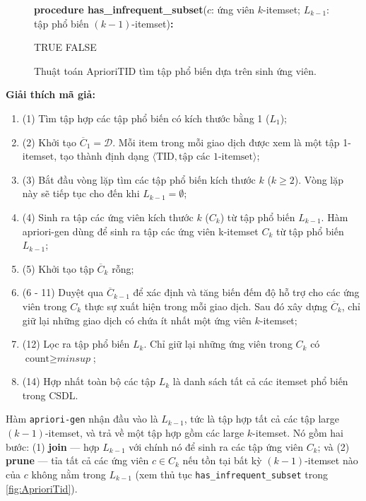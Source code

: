 \begin{figure}[!ht]
\begin{minipage}{\linewidth}
\vspace{0.6em}
\noindent\textbf{procedure has\_infrequent\_subset}($c$: ứng viên $k$-itemset; $L_{k-1}$: tập phổ biến $(k{-}1)$-itemset)\textbf{:}
\begin{algorithmic}[1]
        \State \Return TRUE
    \EndIf
\EndFor
\State \Return FALSE
\end{algorithmic}
\end{minipage}
\caption{Thuật toán AprioriTID tìm tập phổ biến dựa trên sinh ứng viên.}
\label{fig:AprioriTid}
\end{figure}

\textbf{Giải thích mã giả:}
\begin{enumerate}
    \item (1) Tìm tập hợp các tập phổ biến có kích thước bằng 1 ($L_1$);
    \item (2) Khởi tạo $\overline{C}_1 = \mathcal{D}$. Mỗi item trong mỗi giao dịch được xem là một tập 1-itemset, tạo thành định dạng $\langle \text{TID}, \text{tập các 1-itemset} \rangle$;
    \item (3) Bắt đầu vòng lặp tìm các tập phổ biến kích thước $k$ ($k\geq2$). Vòng lặp này sẽ tiếp tục cho đến khi $L_{k-1} = \emptyset$;
    \item (4) Sinh ra tập các ứng viên kích thước $k$ ($C_k$) từ tập phổ biến $L_{k-1}$. Hàm apriori-gen dùng để sinh ra tập các ứng viên k-itemset $C_k$ từ tập phổ biến $L_{k-1}$;
    \item (5) Khởi tạo tập $\overline{C}_k$ rỗng;
    \item (6 - 11) Duyệt qua $\overline{C}_{k-1}$ để xác định và tăng biến đếm độ hỗ trợ cho các ứng viên trong $C_k$ thực sự xuất hiện trong mỗi giao dịch. Sau đó xây dựng $\overline{C}_k$, chỉ giữ lại những giao dịch có chứa ít nhất một ứng viên $k$-itemset;
    \item (12) Lọc ra tập phổ biến $L_k$. Chỉ giữ lại những ứng viên trong $C_k$ có $\text{count} \geq \textit{minsup}$;
    \item (14) Hợp nhất toàn bộ các tập $L_k$ là danh sách tất cả các itemset phổ biến trong CSDL.
\end{enumerate}

Hàm \texttt{apriori-gen} nhận đầu vào là $L_{k-1}$, tức là tập hợp tất cả các tập large $(k{-}1)$-itemset, và trả về một tập hợp gồm các large $k$-itemset. Nó gồm hai bước: (1) \textbf{join} — hợp $L_{k-1}$ với chính nó để sinh ra các tập ứng viên $C_k$; và (2) \textbf{prune} — tỉa tất cả các ứng viên $c \in C_k$ nếu tồn tại bất kỳ $(k{-}1)$-itemset nào của $c$ không nằm trong $L_{k-1}$ (xem thủ tục \texttt{has\_infrequent\_subset} trong \autoref{fig:AprioriTid}).

